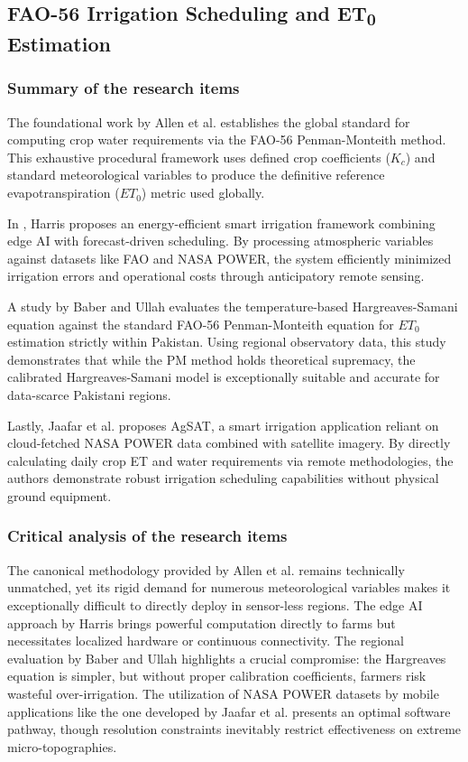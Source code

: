 \documentclass{FastFyp}
\begin{document}
\subsection{FAO-56 Irrigation Scheduling and ET\textsubscript{0} Estimation}

\subsubsection{Summary of the research items}
The foundational work by Allen et al. \cite{allen1998crop} establishes the global standard for computing crop water requirements via the FAO-56 Penman-Monteith method. This exhaustive procedural framework uses defined crop coefficients ($K_c$) and standard meteorological variables to produce the definitive reference evapotranspiration ($ET_0$) metric used globally.

In \cite{harris2025energy}, Harris proposes an energy-efficient smart irrigation framework combining edge AI with forecast-driven scheduling. By processing atmospheric variables against datasets like FAO and NASA POWER, the system efficiently minimized irrigation errors and operational costs through anticipatory remote sensing.

A study by Baber and Ullah \cite{baber2024short} evaluates the temperature-based Hargreaves-Samani equation against the standard FAO-56 Penman-Monteith equation for $ET_0$ estimation strictly within Pakistan. Using regional observatory data, this study demonstrates that while the PM method holds theoretical supremacy, the calibrated Hargreaves-Samani model is exceptionally suitable and accurate for data-scarce Pakistani regions.

Lastly, Jaafar et al. \cite{jaafar2022agsat} proposes AgSAT, a smart irrigation application reliant on cloud-fetched NASA POWER data combined with satellite imagery. By directly calculating daily crop ET and water requirements via remote methodologies, the authors demonstrate robust irrigation scheduling capabilities without physical ground equipment.

\subsubsection{Critical analysis of the research items}
The canonical methodology provided by Allen et al. \cite{allen1998crop} remains technically unmatched, yet its rigid demand for numerous meteorological variables makes it exceptionally difficult to directly deploy in sensor-less regions. The edge AI approach by Harris \cite{harris2025energy} brings powerful computation directly to farms but necessitates localized hardware or continuous connectivity. The regional evaluation by Baber and Ullah \cite{baber2024short} highlights a crucial compromise: the Hargreaves equation is simpler, but without proper calibration coefficients, farmers risk wasteful over-irrigation. The utilization of NASA POWER datasets by mobile applications like the one developed by Jaafar et al. \cite{jaafar2022agsat} presents an optimal software pathway, though resolution constraints inevitably restrict effectiveness on extreme micro-topographies.
\end{document}
